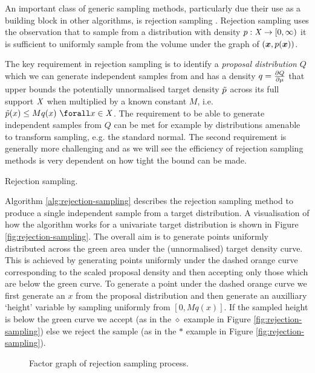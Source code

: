An important class of generic sampling methods, particularly due their use as a building block in other algorithms, is rejection sampling \citep{vonneumann1951various}. Rejection sampling uses the observation that to sample from a distribution with density $p : \mathit{X} \to [0, \infty)$ it is sufficient to uniformly sample from the volume under the graph of $\lpa\vct{x}, \tgtdens(\vct{x})\rpa$.

The key requirement in rejection sampling is to identify a \emph{proposal distribution} $Q$ which we can generate independent samples from and has a density $q=\frac{\partial Q}{\partial \mu}$ that upper bounds the potentially unnormalised target density $\tilde{p}$ across its full support $\mathit{X}$ when multiplied by a known constant $M$, i.e. $\utgtdens(x) \leq M q(x) ~\forall x \in \set{X}$. The requirement to be able to generate independent samples from $Q$ can be met for example by distributions amenable to transform sampling, e.g. the standard normal. The second requirement is generally more challenging and as we will see the efficiency of rejection sampling methods is very dependent on how tight the bound can be made.

\begin{algorithm}[!t]
\caption{Rejection sampling.}
\label{alg:rejection-sampling}

\end{algorithm}

Algorithm \ref{alg:rejection-sampling} describes the rejection sampling method to produce a single independent sample from a target distribution. A visualisation of how the algorithm works for a univariate target distribution is shown in Figure \ref{fig:rejection-sampling}. The overall aim is to generate points uniformly distributed across the green area under the (unnormalised) target density curve. This is achieved by generating points uniformly under the dashed orange curve corresponding to the scaled proposal density and then accepting only those which are below the green curve. To generate a point under the dashed orange curve we first generate an $x$ from the proposal distribution and then generate an auxilliary `height' variable by sampling uniformly from $[0, Mq(x)]$. If the sampled height is below the green curve we accept (as in the $\diamond$ example in Figure \ref{fig:rejection-sampling}) else we reject the sample (as in the $*$ example in Figure \ref{fig:rejection-sampling}).

\begin{figure}[t]
\centering
{}
\caption{Factor graph of rejection sampling process.}
\label{fig:rejection-sampling-factor-graph}
\end{figure}

